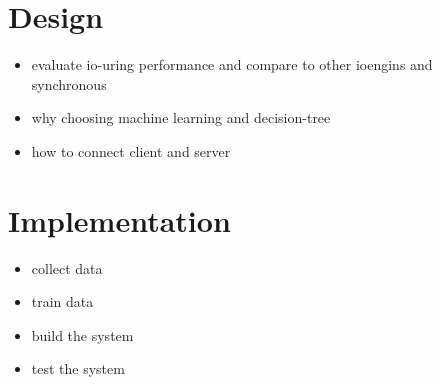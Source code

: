 \documentclass[conference]{IEEEtran}
\begin{document}
\section{Design}
\begin{itemize}
    \item evaluate io-uring performance and compare to other ioengins and synchronous
    \item why choosing machine learning and decision-tree
    \item how to connect client and server
\end{itemize}




\section{Implementation}
\begin{itemize}
    \item collect data
    \item train data
    \item build the system
    \item test the system
\end{itemize}



\end{document}
